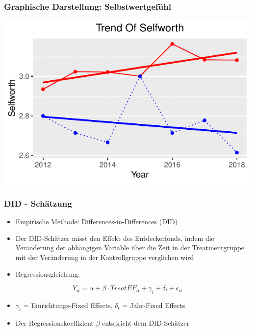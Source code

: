 \begin{frame}[fragile]
\frametitle{Graphische Darstellung: Selbstwertgefühl}
\begin{knitrout}\footnotesize
{}\color{fgcolor}

{\centering \includegraphics[width=\maxwidth]{figure/beamer-DIDSelfworthplot-1} 

}



\end{knitrout}
\end{frame}

\begin{frame}[fragile]
\frametitle{DID - Schätzung}
\begin{itemize}
\item Empirische Methode: Differences-in-Differences (DID)
\item Der DID-Schätzer misst den Effekt des Entdeckerfonds, indem die Veränderung der abhängigen Variable über die Zeit in der Treatmentgruppe mit der Veränderung in der Kontrollgruppe verglichen wird
\linebreak
\item Regressionsgleichung:
\end{itemize}

\begin{equation}
\label{DID equation}
  Y_{it} = \alpha + \beta \cdot TreatEF_{it} + \gamma_{i} + \delta_{t} + \epsilon_{it}
\end{equation}

\begin{itemize}
\item $\gamma_{i}$ = Einrichtungs-Fixed Effects, $\delta_{t}$ = Jahr-Fixed Effects
\item Der Regressionskoeffizient $\beta$ entspricht dem DID-Schätzer
\end{itemize}
\end{frame}


